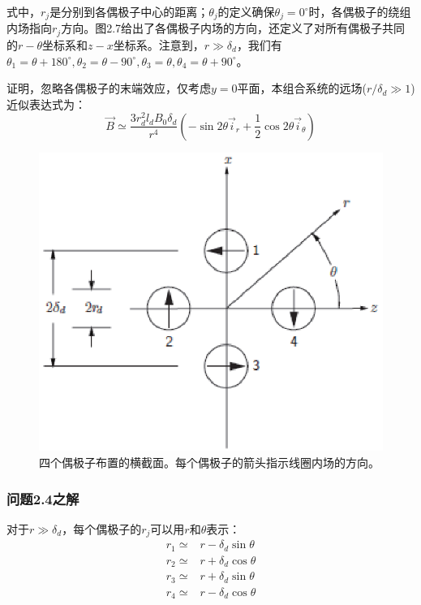 式中，$r_j$是分别到各偶极子中心的距离；$\theta_j$的定义确保$\theta_j=0^\circ$时，各偶极子的绕组内场指向$r_j$方向。图2.7给出了各偶极子内场的方向，还定义了对所有偶极子共同的$r-\theta$坐标系和$z-x$坐标系。注意到，$r\gg \delta_d$，我们有$\mathscr{\theta}_1=\theta+180^\circ,\theta_2=\theta-90^\circ,\theta_3=\theta,\theta_4=\theta + 90^\circ$。

证明，忽略各偶极子的末端效应，仅考虑$y=0$平面，本组合系统的远场($r/\delta_d \gg 1$)近似表达式为：
\begin{equation}
\vec{B}\simeq \frac{3r_d^2 l_d B_0 \delta_d}{r^4}(-\sin 2\theta \vec{i}_r+\frac{1}{2}\cos 2\theta \vec{i}_\theta)
\end{equation}

\begin{figure}[htbp]
  \centering
 \includegraphics[scale=0.8]{chpt2/figs/fig2.7.eps}
  \caption{四个偶极子布置的横截面。每个偶极子的箭头指示线圈内场的方向。}
\end{figure}


\subsubsection*{问题2.4之解}
对于$r\gg \delta_d$，每个偶极子的$r_j$可以用$r$和$\theta$表示：
\begin{align}
r_1\simeq& r-\delta_d \sin\theta \nonumber\tag{S4.1a}\\
r_2\simeq& r+\delta_d \cos\theta\nonumber\tag{S4.1b}\\
r_3\simeq& r+\delta_d \sin\theta\nonumber\tag{S4.1c}\\
r_4\simeq& r-\delta_d \cos\theta\nonumber\tag{S4.1d}
\end{align}

